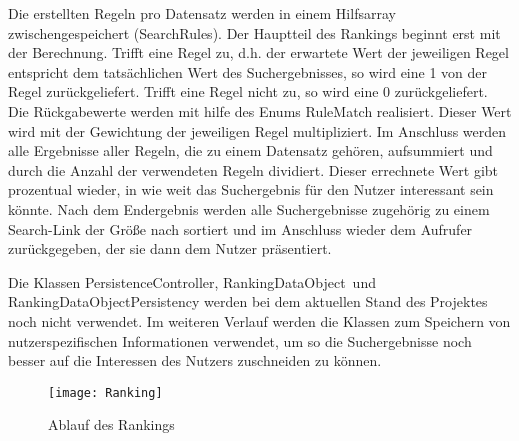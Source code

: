 Die erstellten Regeln pro Datensatz werden in einem Hilfsarray zwischengespeichert (SearchRules). Der Hauptteil des Rankings beginnt erst mit der Berechnung. Trifft eine Regel zu, d.h. der erwartete Wert der jeweiligen Regel entspricht dem tatsächlichen Wert des Suchergebnisses, so wird eine 1 von der Regel zurückgeliefert. Trifft eine Regel nicht zu, so wird eine 0 zurückgeliefert. Die Rückgabewerte werden mit hilfe des Enums \glqq RuleMatch\grqq\xspace realisiert. Dieser Wert wird mit der Gewichtung der jeweiligen Regel multipliziert. Im Anschluss werden alle Ergebnisse aller Regeln, die zu einem Datensatz gehören, aufsummiert und durch die Anzahl der verwendeten Regeln dividiert. Dieser errechnete Wert gibt prozentual wieder, in wie weit das Suchergebnis für den Nutzer interessant sein könnte. Nach dem Endergebnis werden alle Suchergebnisse zugehörig zu einem Search-Link der Größe nach sortiert und im Anschluss wieder dem Aufrufer zurückgegeben, der sie dann dem Nutzer präsentiert. 

Die Klassen \glqq PersistenceController\grqq\xspace, \glqq RankingDataObject\grqq\ und \glqq RankingDataObjectPersistency\grqq\xspace werden bei dem aktuellen Stand des Projektes noch nicht verwendet. Im weiteren Verlauf werden die Klassen zum Speichern von nutzerspezifischen Informationen verwendet, um so die Suchergebnisse noch besser auf die Interessen des Nutzers zuschneiden zu können.

\begin{figure}[ht]
	\centering
	\texttt{[image: Ranking]}
	\caption{Ablauf des Rankings}
	\label{fig:Rankingablauf}
\end{figure}


